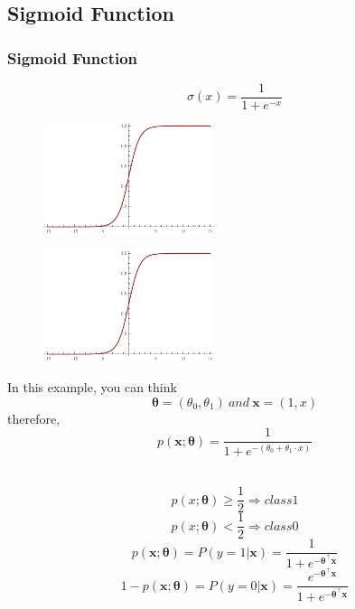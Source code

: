 \subsection{Sigmoid Function}
\begin{frame}
\frametitle{Sigmoid Function}
\[\sigma(x)=\frac{1}{1+e^{-x}}\]
\begin{figure}[t]
\includegraphics[width=5cm]{graphics/1d-sigmoid}
\centering
\end{figure}
\end{frame}
\begin{frame}
\begin{multicols}{2} %
\begin{figure}[t]
\includegraphics[width=5cm]{graphics/1d-sigmoid}
\centering
\end{figure}
\columnbreak  %
In this example, you can think 
\[ \bm{\theta} = (\theta_{0}, \theta_{1}) \ and \ \mathbf{x} = (1, x)\]
therefore, 
\[p(\mathbf{x} ;  \bm{\theta}) =  \frac{1}{1+e^{- ( \theta_{0} +  \theta_{1} \cdot  x )}} \]
\\
\end{multicols}
\begin{multicols}{2}
\[p(x;  \bm{\theta}) \geq \frac{1}{2}  \Rightarrow class 1\]
\[p(x;  \bm{\theta})<\frac{1}{2}  \Rightarrow class 0\]
\columnbreak 
\[p(\mathbf{x};  \bm{\theta})=P(y=1|\mathbf{x}) = \frac{1}{1+e^{-\bm{\theta} ^ {\intercal} \mathbf{x}}}\]
\[1-p(\mathbf{x};  \bm{\theta})=P(y=0|\mathbf{x}) = \frac{e^{-\bm{\theta} ^ {\intercal} \mathbf{x}}} {1+e^{-\bm{\theta}^\intercal \mathbf{x}}} \]
\end{multicols}
\end{frame}
